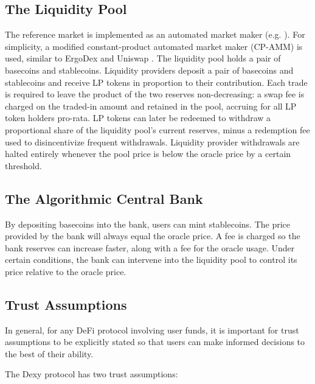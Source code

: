 \documentclass{ifcolog}
\newcommand{\dx}{Dexy}
\begin{document}
\subsection{The Liquidity Pool}
\label{subsec:pool}

The reference market is implemented as an automated market maker (e.g. \cite{xu2021sok}). 
For simplicity, a modified constant-product automated market maker (CP-AMM) is used, 
similar to ErgoDex \cite{ErgoDex} and Uniswap \cite{Uniswap}. The liquidity pool holds a pair of 
basecoins and stablecoins. Liquidity providers deposit a pair of basecoins 
and stablecoins and receive LP tokens in proportion to their contribution. 
Each trade is required to leave the product of the two reserves non-decreasing: 
a swap fee is charged on the traded-in amount and retained in the pool, accruing 
for all LP token holders pro-rata. LP tokens can later be redeemed to withdraw a 
proportional share of the liquidity pool's current reserves, 
minus a redemption fee used to disincentivize frequent withdrawals.
Liquidity provider withdrawals are halted entirely whenever the pool price is 
below the oracle price by a certain threshold.

\subsection{The Algorithmic Central Bank}
\label{subsec:bank}

By depositing basecoins into the bank, users can mint stablecoins. 
The price provided by the bank will always equal the oracle price. 
A fee is charged so the bank reserves can increase faster, along with a fee for the oracle usage.
Under certain conditions, the bank can intervene into the liquidity pool to control its price relative to the oracle price.

\subsection{Trust Assumptions}
\label{subsec:kya}

In general, for any DeFi protocol involving user funds, it is important for trust assumptions to be explicitly stated so 
that users can make informed decisions to the best of their ability.

The \dx{} protocol has two trust assumptions:
\end{document}
